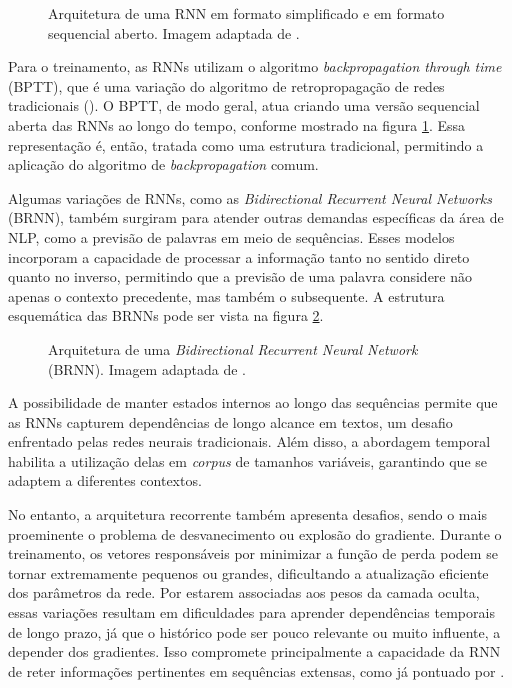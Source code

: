 \begin{figure}[H]
    \centering
    \caption{Arquitetura de uma RNN em formato simplificado e em formato sequencial aberto. Imagem adaptada de \cite{zhang2023dive}.}
    \label{fig:rnns}
    
\end{figure}

Para o treinamento, as RNNs utilizam o algoritmo \textit{backpropagation through time} (BPTT), que é uma variação do algoritmo de retropropagação de redes tradicionais (\cite{schmidt2019recurrent}). O BPTT, de modo geral, atua criando uma versão sequencial aberta das RNNs ao longo do tempo, conforme mostrado na figura \ref{fig:rnns}. Essa representação é, então, tratada como uma estrutura tradicional, permitindo a aplicação do algoritmo de \textit{backpropagation} comum.

Algumas variações de RNNs, como as \textit{Bidirectional Recurrent Neural Networks} (BRNN), também surgiram para atender outras demandas específicas da área de NLP, como a previsão de palavras em meio de sequências. Esses modelos incorporam a capacidade de processar a informação tanto no sentido direto quanto no inverso, permitindo que a previsão de uma palavra considere não apenas o contexto precedente, mas também o subsequente. A estrutura esquemática das BRNNs pode ser vista na figura \ref{fig:brnn}.

\begin{figure}[H]
    \centering
    \caption{Arquitetura de uma \textit{Bidirectional Recurrent Neural Network} (BRNN). Imagem adaptada de \cite{zhang2023dive}.}
    \label{fig:brnn}
    
\end{figure}

A possibilidade de manter estados internos ao longo das sequências permite que as RNNs capturem dependências de longo alcance em textos, um desafio enfrentado pelas redes neurais tradicionais. Além disso, a abordagem temporal habilita a utilização delas em \textit{corpus} de tamanhos variáveis, garantindo que se adaptem a diferentes contextos.

No entanto, a arquitetura recorrente também apresenta desafios, sendo o mais proeminente o problema de desvanecimento ou explosão do gradiente. Durante o treinamento, os vetores responsáveis por minimizar a função de perda podem se tornar extremamente pequenos ou grandes, dificultando a atualização eficiente dos parâmetros da rede. Por estarem associadas aos pesos da camada oculta, essas variações resultam em dificuldades para aprender dependências temporais de longo prazo, já que o histórico pode ser pouco relevante ou muito influente, a depender dos gradientes. Isso compromete principalmente a capacidade da RNN de reter informações pertinentes em sequências extensas, como já pontuado por \citet{schmidt2019recurrent}.

